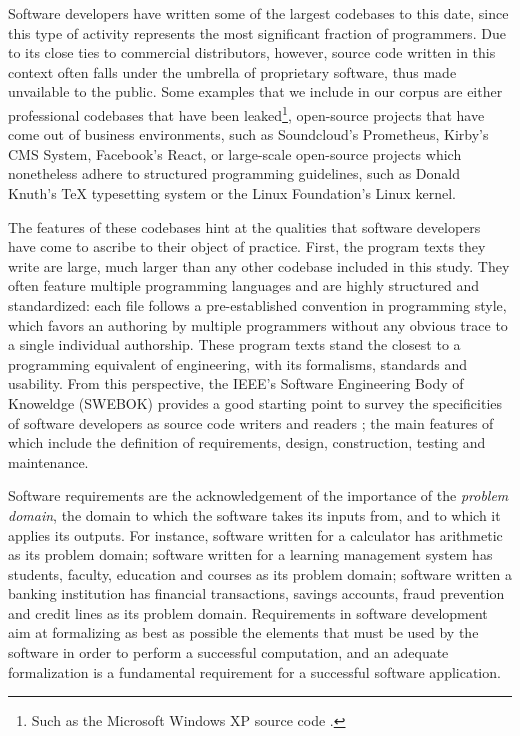 Software developers have written some of the largest codebases to this date, since this type of activity represents the most significant fraction of programmers. Due to its close ties to commercial distributors, however, source code written in this context often falls under the umbrella of proprietary software, thus made unvailable to the public. Some examples that we include in our corpus are either professional codebases that have been leaked\footnote{Such as the Microsoft Windows XP source code \citep{warren_windows_2020}.}, open-source projects that have come out of business environments, such as Soundcloud's Prometheus, Kirby's CMS System, Facebook's React, or large-scale open-source projects which nonetheless adhere to structured programming guidelines, such as Donald Knuth's TeX typesetting system or the Linux Foundation's Linux kernel.

\spacer

The features of these codebases hint at the qualities that software developers have come to ascribe to their object of practice. First, the program texts they write are large, much larger than any other codebase included in this study. They often feature multiple programming languages and are highly structured and standardized: each file follows a pre-established convention in programming style, which favors an authoring by multiple programmers without any obvious trace to a single individual authorship. These program texts stand the closest to a programming equivalent of engineering, with its formalisms, standards and usability. From this perspective, the IEEE's Software Engineering Body of Knoweldge (SWEBOK) provides a good starting point to survey the specificities of software developers as source code writers and readers \citep{bourque_swebok_2014}; the main features of which include the definition of requirements, design, construction, testing and maintenance.

Software requirements are the acknowledgement of the importance of the \emph{problem domain}, the domain to which the software takes its inputs from, and to which it applies its outputs. For instance, software written for a calculator has arithmetic as its problem domain; software written for a learning management system has students, faculty, education and courses as its problem domain; software written a banking institution has financial transactions, savings accounts, fraud prevention and credit lines as its problem domain. Requirements in software development aim at formalizing as best as possible the elements that must be used by the software in order to perform a successful computation, and an adequate formalization is a fundamental requirement for a successful software application.

